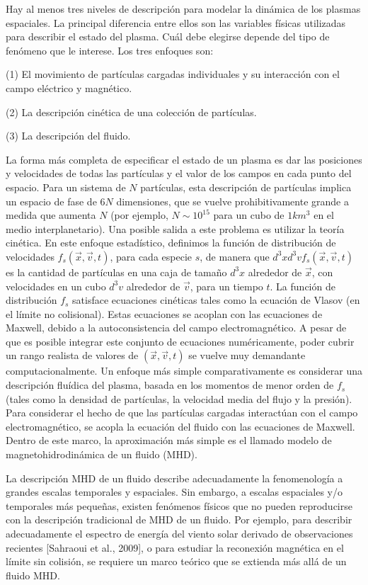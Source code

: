 Hay al menos tres niveles de descripción para modelar la dinámica de
los plasmas espaciales. La principal diferencia entre ellos son las
variables físicas utilizadas para describir el estado del plasma. Cuál
debe elegirse depende del tipo de fenómeno que le interese. Los tres
enfoques son:

(1) El movimiento de partículas cargadas individuales y su interacción
con el campo eléctrico y magnético.

(2) La descripción cinética de una colección de partículas.

(3) La descripción del fluido.

La forma más completa de especificar el estado de un plasma es dar las
posiciones y velocidades de todas las partículas y el valor de los
campos en cada punto del espacio. Para un sistema de $N$ partículas,
esta descripción de partículas implica un espacio de fase de $6N$
dimensiones, que se vuelve prohibitivamente grande a medida que
aumenta $N$ (por ejemplo, $N\sim 10^{15}$ para un cubo de
$\si{1}{km^3}$ en el medio interplanetario). Una posible salida a este
problema es utilizar la teoría cinética. En este enfoque estadístico,
definimos la función de distribución de velocidades $f_s(\vec{x},
\vec{v}, t)$, para cada especie $s$, de manera que $d^3x d^3v
f_s(\vec{x}, \vec{v}, t)$ es la cantidad de partículas en una caja de
tamaño $d^3x$ alrededor de $\vec{x}$, con velocidades en un cubo
$d^3v$ alrededor de $\vec{v}$, para un tiempo $t$. La función de
distribución $f_s$ satisface ecuaciones cinéticas tales como la
ecuación de Vlasov (en el límite no colisional). Estas ecuaciones se
acoplan con las ecuaciones de Maxwell, debido a la autoconsistencia
del campo electromagnético. A pesar de que es posible integrar este
conjunto de ecuaciones numéricamente, poder cubrir un rango realista
de valores de $(\vec{x}, \vec{v}, t)$ se vuelve muy demandante
computacionalmente. Un enfoque más simple comparativamente es
considerar una descripción fluídica del plasma, basada en los momentos
de menor orden de $f_s$ (tales como la densidad de partículas, la
velocidad media del flujo y la presión). Para considerar el hecho de
que las partículas cargadas interactúan con el campo electromagnético,
se acopla la ecuación del fluido con las ecuaciones de Maxwell. Dentro
de este marco, la aproximación más simple es el llamado modelo de
magnetohidrodinámica de un fluido (MHD).

La descripción MHD de un fluido describe adecuadamente la
fenomenología a grandes escalas temporales y espaciales.  Sin embargo,
a escalas espaciales y/o temporales más pequeñas, existen fenómenos
físicos que no pueden reproducirse con la descripción tradicional de
MHD de un fluido. Por ejemplo, para describir adecuadamente el
espectro de energía del viento solar derivado de observaciones
recientes [Sahraoui et al., 2009], o para estudiar la reconexión
magnética en el límite sin colisión, se requiere un marco teórico que
se extienda más allá de un fluido MHD.


